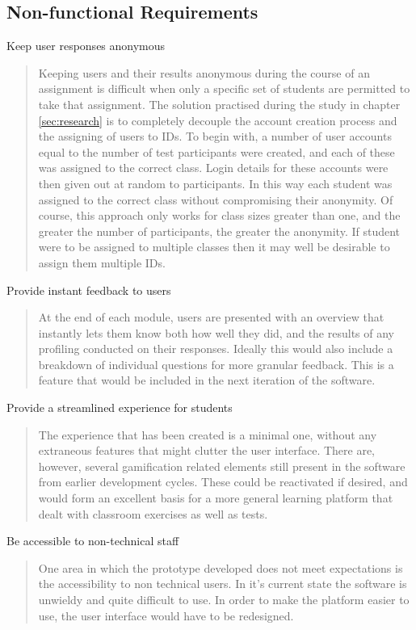 \documentclass[12pt,a4paper,twoside]{report}
\begin{document}
\subsection{Non-functional Requirements}
Keep user responses anonymous
\begin{quote}
	Keeping users and their results anonymous during the course of an assignment is difficult when only a specific set of students are permitted to take that assignment. The solution practised during the study in chapter \ref{sec:research} is to completely decouple the account creation process and the assigning of users to IDs. To begin with, a number of user accounts equal to the number of test participants were created, and each of these was assigned to the correct class. Login details for these accounts were then given out at random to participants. In this way each student was assigned to the correct class without compromising their anonymity. Of course, this approach only works for class sizes greater than one, and the greater the number of participants, the greater the anonymity. If student were to be assigned to multiple classes then it may well be desirable to assign them multiple IDs.
\end{quote}
Provide instant feedback to users
\begin{quote}
	At the end of each module, users are presented with an overview that instantly lets them know both how well they did, and the results of any profiling conducted on their responses. Ideally this would also include a breakdown of individual questions for more granular feedback. This is a feature that would be included in the next iteration of the software.
\end{quote}
Provide a streamlined experience for students
\begin{quote}
	The experience that has been created is a minimal one, without any extraneous features that might clutter the user interface. There are, however, several gamification related elements still present in the software from earlier development cycles. These could be reactivated if desired, and would form an excellent basis for a more general learning platform that dealt with classroom exercises as well as tests.
\end{quote}
Be accessible to non-technical staff
\begin{quote}
	One area in which the prototype developed does not meet expectations is the accessibility to non technical users. In it's current state the software is unwieldy and quite difficult to use. In order to make the platform easier to use, the user interface would have to be redesigned.
\end{quote}
\end{document}
